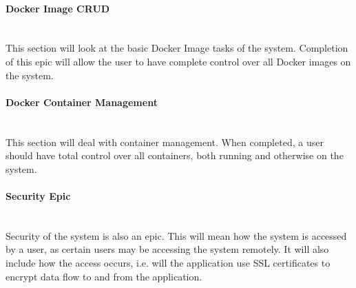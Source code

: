 \newpage
\paragraph{Docker Image CRUD}\mbox{}\\
This section will look at the basic Docker Image tasks of the system. Completion of this epic will allow the user to have complete control over all Docker images on the system.

\begin{figure}[!htbp]
\centering
{}
\end{figure}

\paragraph{Docker Container Management}\mbox{}\\
This section will deal with container management. When completed, a user should have total control over all containers, both running and otherwise on the system.

\begin{figure}[!htbp]
\centering
{}
\end{figure}

\newpage
\paragraph{Security Epic}\mbox{}\\
Security of the system is also an epic. This will mean how the system is accessed by a user, as certain users may be accessing the system remotely. It will also include how the access occurs, i.e. will the application use SSL certificates to encrypt data flow to and from the application.

